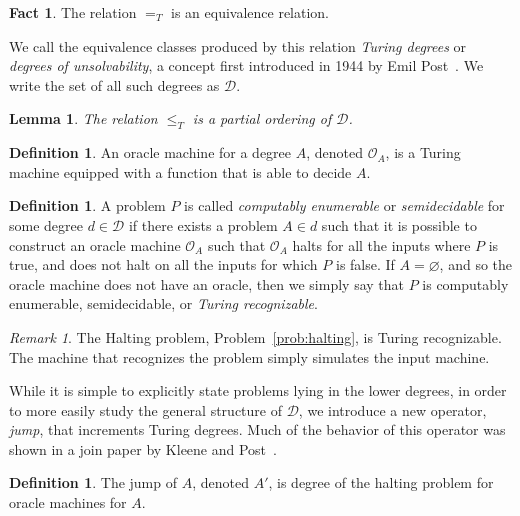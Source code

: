 \documentclass[psamsfonts]{amsart}
\newtheorem{lem}[thm]{Lemma}
\theoremstyle{definition}
\newtheorem{defn}[thm]{Definition}
\newtheorem{fact}[thm]{Fact}
\theoremstyle{remark}
\newtheorem{rem}[thm]{Remark}
\numberwithin{equation}{section}
\begin{document}
\begin{fact}
  The relation $=_T$ is an equivalence relation.
\end{fact}

We call the equivalence classes produced by this relation \emph{Turing degrees}
or \emph{degrees of unsolvability}, a concept first introduced in
1944 by Emil Post~\cite{post44:_recur}. We write the set of all such degrees as $\mathcal{D}$.

\begin{lem}
  The relation $\leq_T$ is a partial ordering of $\mathcal{D}$.
\end{lem}

\begin{defn}
  An oracle machine for a degree $A$, denoted $\mathcal{O}_A$, is a Turing
  machine equipped with a function that is able to decide $A$.
\end{defn}

\begin{defn}
  A problem $P$ is called \emph{computably enumerable} or \emph{semidecidable}
  for some degree $d\in\mathcal{D}$ if there exists a problem $A\in d$ such that
  it is possible to construct an oracle machine $\mathcal{O}_A$ such that
  $\mathcal{O}_A$ halts for all the inputs where $P$ is true, and does not halt
  on all the inputs for which $P$ is false. If $A=\varnothing$, and so the
  oracle machine does not have an oracle, then we simply say that $P$ is
  computably enumerable, semidecidable, or \emph{Turing recognizable}.
\end{defn}
\begin{rem}
  The Halting problem, Problem~\ref{prob:halting}, is Turing recognizable. The
  machine that recognizes the problem simply simulates the input machine.
\end{rem}

While it is simple to explicitly state problems lying in the lower degrees,
in order to more easily study the general structure of $\mathcal{D}$, we
introduce a new operator, \emph{jump}, that increments Turing degrees. Much of
the behavior of this operator was shown in a join paper by Kleene and Post~\cite{kleene54_upper_semi_lattic_degrees_recur_unsol}.

\begin{defn}
  The jump of $A$, denoted $A'$, is degree of the halting problem for oracle
  machines for $A$.
\end{defn}
\end{document}
